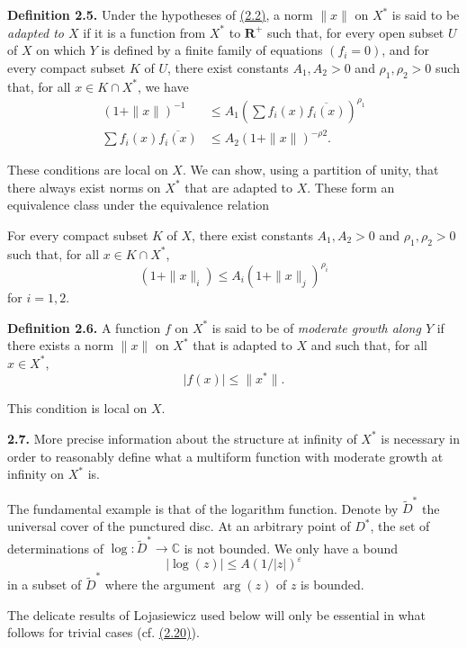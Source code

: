 \documentclass{report}
\newenvironment{itenv*}
  {\phantomsection\par\medskip\noindent\itshape}
  {\par\medskip}
\newenvironment{rmenv}[1]
  {\phantomsection\par\medskip\noindent\textbf{#1.}\rmfamily}
  {\par\medskip}
\newcommand{\CC}{\mathbb{C}}
\newcommand{\RR}{\mathbf{R}}
\renewcommand{\leq}{\leqslant}
\newcommand{\oldpage}[1]{\marginpar{\footnotesize$\Big\vert$ \textit{p.~#1}}}
\begin{document}
\begin{rmenv}{Definition 2.5}
\label{II.2.5}
  Under the hypotheses of \hyperref[II.2.2]{(2.2)}, a norm $\|x\|$ on $X^*$ is said to be \emph{adapted to $X$} if it is a function from $X^*$ to $\RR^+$ such that, for every open subset $U$ of $X$ on which $Y$ is defined by a finite family of equations $(f_i=0)$, and for every compact subset $K$ of $U$, there exist constants $A_1,A_2>0$ and $\rho_1,\rho_2>0$ such that, for all $x\in K\cap X^*$, we have
  \[
    \begin{aligned}
      (1+\|x\|)^{-1}
      &\leq A_1\left(\sum f_i(x)\overline{f_i(x)}\right)^{\rho_1}
    \\\sum f_i(x)\overline{f_i(x)}
      &\leq A_2(1+\|x\|)^{-\rho2}.
    \end{aligned}
  \]

  \oldpage{63}
  These conditions are local on $X$.
  We can show, using a partition of unity, that there always exist norms on $X^*$ that are adapted to $X$.
  These form an equivalence class under the equivalence relation

  \begin{itenv*}
  \label{II.2.5.*'M}
    For every compact subset $K$ of $X$, there exist constants $A_1,A_2>0$ and $\rho_1,\rho_2>0$ such that, for all $x\in K\cap X^*$,
    \[
      (1+\|x\|_i) \leq A_i(1+\|x\|_j)^{\rho_i}
    \tag{$*'$M}
    \]
    for $i=1,2$.
  \end{itenv*}
\end{rmenv}

\begin{rmenv}{Definition 2.6}
\label{II.2.6}
  A function $f$ on $X^*$ is said to be of \emph{moderate growth along $Y$} if there exists a norm $\|x\|$ on $X^*$ that is adapted to $X$ and such that, for all $x\in X^*$,
  \[
    |f(x)| \leq \|x^*\|.
  \]

  This condition is local on $X$.
\end{rmenv}

\begin{rmenv}{2.7}
\label{II.2.7}
  More precise information about the structure at infinity of $X^*$ is necessary in order to reasonably define what a multiform function with moderate growth at infinity on $X^*$ is.

  The fundamental example is that of the logarithm function.
  Denote by $\widetilde{D}^*$ the universal cover of the punctured disc.
  At an arbitrary point of $D^*$, the set of determinations of $\log\colon\widetilde{D}^*\to\CC$ is not bounded.
  We only have a bound
  \[
    |\log(z)| \leq A(1/|z|)^\varepsilon
  \]
  in a subset of $\widetilde{D}^*$ where the argument $\arg(z)$ of $z$ is bounded.

  The delicate results of Lojasiewicz used below will only be essential in what follows for trivial cases (cf. \hyperref[II.2.20]{(2.20)}).
\end{rmenv}
\end{document}
